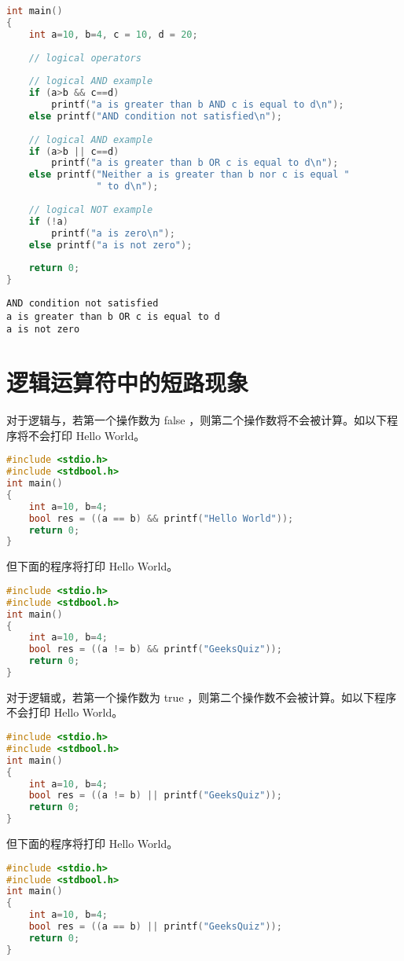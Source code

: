 \documentclass[10pt,a4paper%
tablecaptionabove]{article}
\def\tf{\ttfamily}
\begin{document}
\begin{CJK}{UTF8}{gkai}
\begin{lstlisting}[language=c,backgroundcolor=\color{red!10}]
int main()
{
    int a=10, b=4, c = 10, d = 20;
 
    // logical operators
 
    // logical AND example
    if (a>b && c==d)
        printf("a is greater than b AND c is equal to d\n");
    else printf("AND condition not satisfied\n");
 
    // logical AND example
    if (a>b || c==d)
        printf("a is greater than b OR c is equal to d\n");
    else printf("Neither a is greater than b nor c is equal "
                " to d\n");
 
    // logical NOT example
    if (!a)
        printf("a is zero\n");
    else printf("a is not zero");
 
    return 0;
}  
\end{lstlisting}

\begin{lstlisting}[backgroundcolor=\color{red!10}]
AND condition not satisfied
a is greater than b OR c is equal to d
a is not zero  
\end{lstlisting}

\section{逻辑运算符中的短路现象}

对于逻辑与，若第一个操作数为 {\tf false} ，则第二个操作数将不会被计算。如以下程序将不会打印 {\tf Hello World}。
\begin{lstlisting}[language=c,backgroundcolor=\color{red!10}]
#include <stdio.h>
#include <stdbool.h>
int main()
{
    int a=10, b=4;
    bool res = ((a == b) && printf("Hello World"));
    return 0;
}  
\end{lstlisting}
但下面的程序将打印 {\tf Hello World}。
\begin{lstlisting}[language=c,backgroundcolor=\color{red!10}]
#include <stdio.h>
#include <stdbool.h>
int main()
{
    int a=10, b=4;
    bool res = ((a != b) && printf("GeeksQuiz"));
    return 0;
}
\end{lstlisting}
对于逻辑或，若第一个操作数为 {\tf true} ，则第二个操作数不会被计算。如以下程序不会打印 {\tf Hello World}。
\begin{lstlisting}[language=c,backgroundcolor=\color{red!10}]
#include <stdio.h>
#include <stdbool.h>
int main()
{
    int a=10, b=4;
    bool res = ((a != b) || printf("GeeksQuiz"));
    return 0;
}
\end{lstlisting}
但下面的程序将打印 {\tf Hello World}。
\begin{lstlisting}[language=c,backgroundcolor=\color{red!10}]
#include <stdio.h>
#include <stdbool.h>
int main()
{
    int a=10, b=4;
    bool res = ((a == b) || printf("GeeksQuiz"));
    return 0;
}
\end{lstlisting}
\end{CJK}
\end{document}
